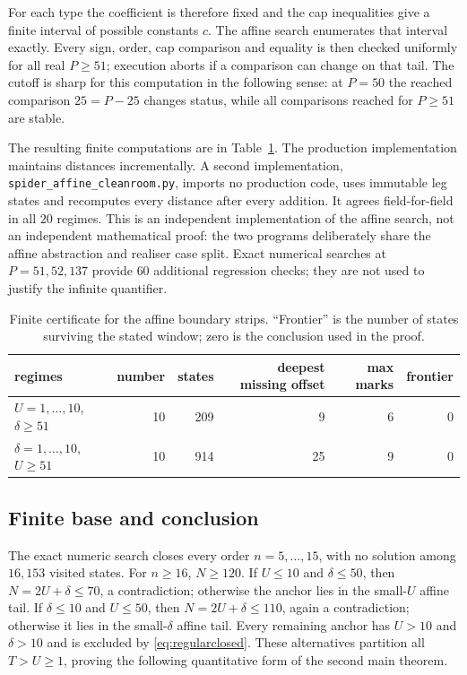 \documentclass[11pt,a4paper]{article}
\theoremstyle{plain}
\theoremstyle{remark}
\newcommand{\file}[1]{\texttt{#1}}
\begin{document}
For each type the coefficient is therefore fixed and the cap inequalities
give a finite interval of possible constants $c$.  The affine search enumerates
that interval exactly.  Every sign, order, cap comparison and equality is then
checked uniformly for all real $P\ge51$; execution aborts if a comparison can
change on that tail.  The cutoff is sharp for this computation in the following
sense: at $P=50$ the reached comparison $25=P-25$ changes status, while all
comparisons reached for $P\ge51$ are stable.

The resulting finite computations are in Table~\ref{tab:spidercert}.  The
production implementation maintains distances incrementally.  A second
implementation, \file{spider\_affine\_cleanroom.py}, imports no production
code, uses immutable leg states and recomputes every distance after every
addition.  It agrees field-for-field in all $20$ regimes.  This is an
independent implementation of the affine search, not an independent
mathematical proof: the two programs deliberately share the affine abstraction
and realiser case split.  Exact numerical searches at $P=51,52,137$ provide
$60$ additional regression checks; they are not used to justify the infinite
quantifier.

\begin{table}[ht]
\centering
\caption{Finite certificate for the affine boundary strips.  ``Frontier'' is
the number of states surviving the stated window; zero is the conclusion used
in the proof.}
\label{tab:spidercert}
\small
\begin{tabular}{@{}lrrrrr@{}}
\toprule
regimes & number & states & deepest missing offset & max marks & frontier\\
\midrule
$U=1,\ldots,10$, $\delta\ge51$ & 10 & 209 & 9  & 6 & 0\\
$\delta=1,\ldots,10$, $U\ge51$ & 10 & 914 & 25 & 9 & 0\\
\bottomrule
\end{tabular}
\end{table}

\subsection{Finite base and conclusion}

The exact numeric search closes every order $n=5,\ldots,15$, with no solution
among $16{,}153$ visited states.  For $n\ge16$, $N\ge120$.  If $U\le10$ and
$\delta\le50$, then $N=2U+\delta\le70$, a contradiction; otherwise the anchor
lies in the small-$U$ affine tail.  If $\delta\le10$ and $U\le50$, then
$N=2U+\delta\le110$, again a contradiction; otherwise it lies in the
small-$\delta$ affine tail.  Every remaining anchor has $U>10$ and
$\delta>10$ and is excluded by \eqref{eq:regularclosed}.  These alternatives
partition all $T>U\ge1$, proving the following quantitative form of the second
main theorem.
\end{document}
